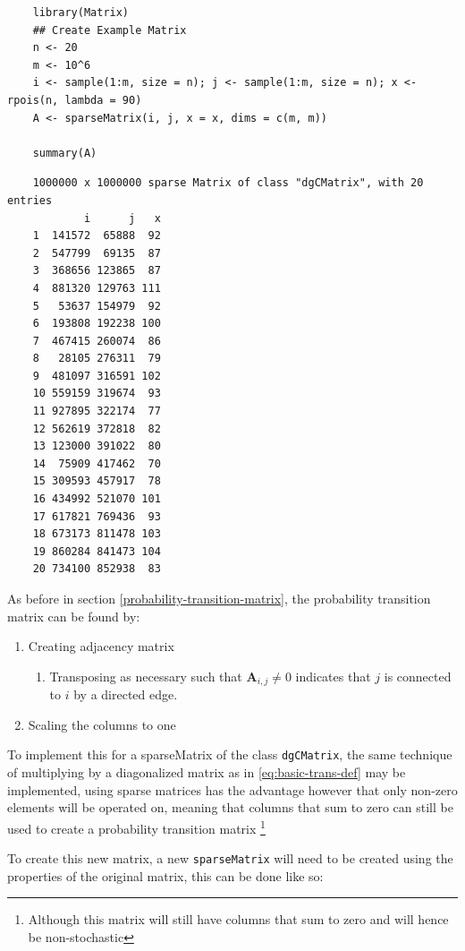\documentclass[11pt, twoside]{report}
\begin{document}
\begin{tcolorbox}
    \begin{verbatim}
    library(Matrix)
    ## Create Example Matrix
    n <- 20
    m <- 10^6
    i <- sample(1:m, size = n); j <- sample(1:m, size = n); x <- rpois(n, lambda = 90)
    A <- sparseMatrix(i, j, x = x, dims = c(m, m))

    summary(A)
    \end{verbatim}
\tcblower
    \begin{verbatim}
    1000000 x 1000000 sparse Matrix of class "dgCMatrix", with 20 entries
            i      j   x
    1  141572  65888  92
    2  547799  69135  87
    3  368656 123865  87
    4  881320 129763 111
    5   53637 154979  92
    6  193808 192238 100
    7  467415 260074  86
    8   28105 276311  79
    9  481097 316591 102
    10 559159 319674  93
    11 927895 322174  77
    12 562619 372818  82
    13 123000 391022  80
    14  75909 417462  70
    15 309593 457917  78
    16 434992 521070 101
    17 617821 769436  93
    18 673173 811478 103
    19 860284 841473 104
    20 734100 852938  83
    \end{verbatim}
\end{tcolorbox}

As before in section \ref{probability-transition-matrix}, the probability transition matrix can be found by:

\begin{enumerate}
\item Creating adjacency matrix
\begin{enumerate}
\item Transposing as necessary such that \(\mathbf{A}_{i,j}\neq 0\) indicates that \(j\) is connected to \(i\) by a directed edge.
\end{enumerate}
\item Scaling the columns to one
\end{enumerate}

To implement this for a sparseMatrix of the class \texttt{dgCMatrix}, the same
technique of multiplying by a diagonalized matrix as in \eqref{eq:basic-trans-def} may be
implemented, using sparse matrices has the advantage however that only non-zero
elements will be operated on, meaning that columns that sum to zero can still
be used to create a probability transition matrix \footnote{Although this matrix will
still have columns that sum to zero and will hence be non-stochastic}

To create this new matrix, a new \texttt{sparseMatrix} will
need to be created using the properties of the original matrix, this can be done
like so:
\end{document}

